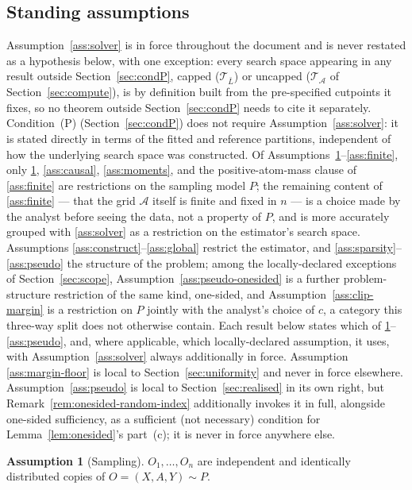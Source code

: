 \documentclass[11pt]{article}
\theoremstyle{plain}
\theoremstyle{definition}
\newtheorem{assumption}{Assumption}
\theoremstyle{remark}
\newcommand{\cA}{\mathcal{A}}
\newcommand{\cT}{\mathcal{T}}
\begin{document}
\subsection{Standing assumptions}

Assumption~\ref{ass:solver} is in force throughout the document and is never
restated as a hypothesis below, with one exception: every search
space appearing in any result outside Section~\ref{sec:condP}, capped
($\cT_{\bar L}$) or uncapped ($\cT_\cA$ of
Section~\ref{sec:compute}), is by definition built from the pre-specified
cutpoints it fixes, so no theorem outside Section~\ref{sec:condP} needs to
cite it separately. Condition~(P) (Section~\ref{sec:condP}) does not require
Assumption~\ref{ass:solver}: it is stated directly in terms of the fitted and
reference partitions, independent of how the underlying search space was
constructed. Of
Assumptions~\ref{ass:iid}--\ref{ass:finite}, only \ref{ass:iid},
\ref{ass:causal}, \ref{ass:moments}, and the positive-atom-mass clause of
\ref{ass:finite} are restrictions on the sampling model $P$; the remaining
content of \ref{ass:finite} --- that the grid $\cA$ itself is finite and
fixed in $n$ --- is a choice made by the analyst before seeing the data, not
a property of $P$, and is more accurately grouped with \ref{ass:solver} as a
restriction on the estimator's search space. Assumptions
\ref{ass:construct}--\ref{ass:global} restrict the estimator, and
\ref{ass:sparsity}--\ref{ass:pseudo} the structure of the problem; among the
locally-declared exceptions of Section~\ref{sec:scope},
Assumption~\ref{ass:pseudo-onesided} is a further problem-structure
restriction of the same kind, one-sided, and Assumption~\ref{ass:clip-margin}
is a restriction on $P$ jointly with the analyst's choice of $c$, a category
this three-way split does not otherwise contain. Each
result below states which of \ref{ass:iid}--\ref{ass:pseudo}, and, where
applicable, which locally-declared assumption, it uses, with
Assumption~\ref{ass:solver} always additionally in force. Assumption
\ref{ass:margin-floor} is local to
Section~\ref{sec:uniformity} and never in force elsewhere.
Assumption~\ref{ass:pseudo} is local to Section~\ref{sec:realised} in its own
right, but Remark~\ref{rem:onesided-random-index} additionally invokes it in
full, alongside one-sided sufficiency, as a sufficient (not necessary)
condition for Lemma~\ref{lem:onesided}'s part~(c); it is never in force
anywhere else.

\begin{assumption}[Sampling]\label{ass:iid}
$O_1,\dots,O_n$ are independent and identically distributed copies of
$O=(X,A,Y)\sim P$.
\end{assumption}
\end{document}
